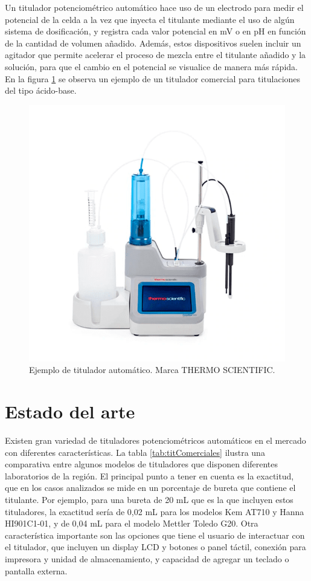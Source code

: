 Un titulador potenciométrico automático hace uso de un electrodo para medir el potencial de la celda a la vez que inyecta el titulante mediante el uso de algún sistema de dosificación, y registra cada valor potencial en mV o en pH en función de la cantidad de volumen añadido. Además, estos dispositivos suelen incluir un agitador que permite acelerar el proceso de mezcla entre el titulante añadido y la solución, para que el cambio en el potencial se visualice de manera más rápida.
En la figura \ref{fig:titThermo} se observa un ejemplo de un titulador comercial para titulaciones del tipo ácido-base.

\begin{figure}[htbp]
	\centering
	\includegraphics[width=.6\textwidth]{./Figures/titThermo.png}
	\caption{Ejemplo de titulador automático. Marca THERMO SCIENTIFIC\protect\footnotemark.}
	\label{fig:titThermo}
\end{figure}




\section{Estado del arte}

Existen gran variedad de tituladores potenciométricos automáticos en el mercado con diferentes características. La tabla \ref{tab:titComerciales} ilustra una comparativa entre algunos modelos de tituladores que disponen diferentes laboratorios de la región. El principal punto a tener en cuenta es la exactitud, que en los casos analizados se mide en un porcentaje de bureta que contiene el titulante. Por ejemplo, para una bureta de 20 mL que es la que incluyen estos tituladores, la exactitud sería de 0,02 mL para los modelos Kem AT710 y Hanna HI901C1-01, y de 0,04 mL para el modelo Mettler Toledo G20. Otra característica importante son las opciones que tiene el usuario de interactuar con el titulador, que incluyen un display LCD y botones o panel táctil, conexión para impresora y unidad de almacenamiento, y capacidad de agregar un teclado o pantalla externa.


